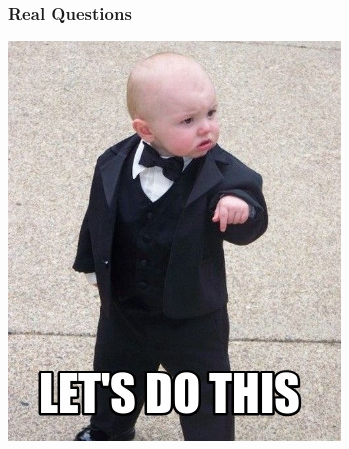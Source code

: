 \documentclass{beamer}
\begin{document}
\begin{frame}
\frametitle{Real Questions}
    \centering
	   \includegraphics[scale = 0.5]{letsDoThis4.jpg}
\end{frame} 
\end{document}
